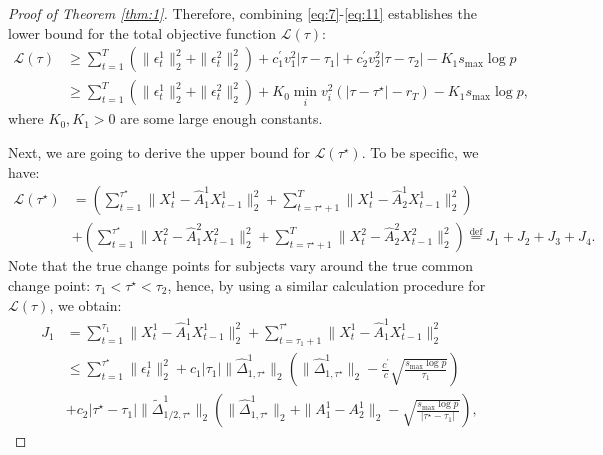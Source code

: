 \documentclass[11pt]{article}
\begin{document}
\begin{proof}[Proof of Theorem \ref{thm:1}]
Therefore, combining \eqref{eq:7}-\eqref{eq:11} establishes the lower bound for the total objective function $\mathcal{L}(\tau)$:
\begin{equation}
    \label{eq:12}
    \begin{aligned}
        \mathcal{L}(\tau) 
        &\geq \sum_{t=1}^T(\|\epsilon_t^1\|_2^2 + \|\epsilon_t^2\|_2^2) + c_1^\prime v_1^2|\tau-\tau_1| + c_2^\prime v_2^2|\tau-\tau_2| - K_1s_{\max}\log p \\
        &\geq \sum_{t=1}^T(\|\epsilon_t^1\|_2^2 + \|\epsilon_t^2\|_2^2) + K_0 \min_i v_i^2\left(|\tau-\tau^\star| - r_T\right) - K_1s_{\max}\log p,
    \end{aligned}
\end{equation}
where $K_0, K_1>0$ are some large enough constants. 

Next, we are going to derive the upper bound for $\mathcal{L}(\tau^\star)$. To be specific, we have:
\begin{equation}
    \label{eq:13}
    \begin{aligned}
        \mathcal{L}(\tau^\star) &= \left(\sum_{t=1}^{\tau^\star}\|X_t^1 - \widehat{A}_1^1X_{t-1}^1\|_2^2 + \sum_{t=\tau^\star+1}^T\|X_t^1 - \widehat{A}_2^1X_{t-1}^1\|_2^2\right) \\
        &+ \left(\sum_{t=1}^{\tau^\star}\|X_t^2 - \widehat{A}_1^2X_{t-1}^2\|_2^2 + \sum_{t=\tau^\star+1}^T\|X_t^2 - \widehat{A}_2^2X_{t-1}^2\|_2^2\right) \overset{\text{def}}{=} J_1 + J_2 + J_3 + J_4.
    \end{aligned}
\end{equation}
Note that the true change points for subjects vary around the true common change point: $\tau_1 < \tau^\star < \tau_2$, hence, by using a similar calculation procedure for $\mathcal{L}(\tau)$, we obtain:
\begin{align}
    \label{eq:14}
    J_1 
    &= \sum_{t=1}^{\tau_1}\|X_t^1 - \widehat{A}^1_1X_{t-1}^1\|_2^2 + \sum_{t=\tau_1+1}^{\tau^\star}\|X_t^1 - \widehat{A}_1^1X_{t-1}^1\|_2^2 \nonumber \\
    &\leq \sum_{t=1}^{\tau^\star} \|\epsilon_t^1\|_2^2 + c_1|\tau_1|\|\widehat{\Delta}_{1,\tau^\star}^1\|_2\left(\|\widehat{\Delta}_{1,\tau^\star}^1\|_2 - \frac{c^\prime}{c}\sqrt{\frac{s_{\max}\log p}{\tau_1}}\right) \nonumber \\
    &+ c_2|\tau^\star-\tau_1|\|\widetilde{\Delta}_{1/2,\tau^\star}^1\|_2\left(\|\widehat{\Delta}_{1,\tau^\star}^1\|_2 + \|A_1^1 - A_2^1\|_2 - \sqrt{\frac{s_{\max}\log p}{|\tau^\star-\tau_1|}}\right),
\end{align}

\end{proof}
\end{document}
